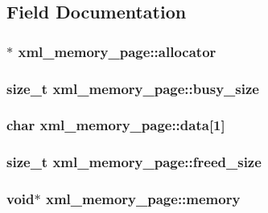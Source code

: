 \subsection{Field Documentation}
\hypertarget{structxml__memory__page_adf8fa143123a842baa59b82fc3d83c3b}{
\subsubsection[{allocator}]{$\ast$ {\bf xml\_\-memory\_\-page::allocator}}}
\label{structxml__memory__page_adf8fa143123a842baa59b82fc3d83c3b}
\hypertarget{structxml__memory__page_a04780ddabc14b45baba3d1ded79d355a}{
\subsubsection[{busy\_\-size}]{\setlength{\rightskip}{0pt plus 5cm}size\_\-t {\bf xml\_\-memory\_\-page::busy\_\-size}}}
\label{structxml__memory__page_a04780ddabc14b45baba3d1ded79d355a}
\hypertarget{structxml__memory__page_abd99ed1563aa66fb3573a9208452685c}{
\subsubsection[{data}]{\setlength{\rightskip}{0pt plus 5cm}char {\bf xml\_\-memory\_\-page::data}\mbox{[}1\mbox{]}}}
\label{structxml__memory__page_abd99ed1563aa66fb3573a9208452685c}
\hypertarget{structxml__memory__page_ab4c29645546530a0e1938b53979890a8}{
\subsubsection[{freed\_\-size}]{\setlength{\rightskip}{0pt plus 5cm}size\_\-t {\bf xml\_\-memory\_\-page::freed\_\-size}}}
\label{structxml__memory__page_ab4c29645546530a0e1938b53979890a8}
\hypertarget{structxml__memory__page_ab51315db80e7f2a5afb87c56fedcd734}{
\subsubsection[{memory}]{\setlength{\rightskip}{0pt plus 5cm}void$\ast$ {\bf xml\_\-memory\_\-page::memory}}}
